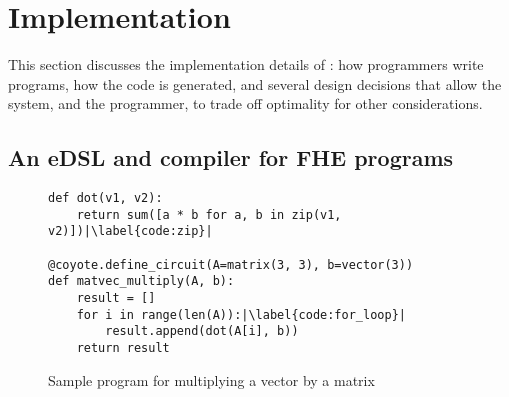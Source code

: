 \section{Implementation}\label{sec:implementation}

This section discusses the implementation details of \system: how programmers write \system programs, how the code is generated, and several design decisions that allow the system, and the programmer, to trade off optimality for other considerations.

  

\subsection{An eDSL and compiler for FHE programs}
\begin{figure}
    \begin{verbatim}
def dot(v1, v2):
    return sum([a * b for a, b in zip(v1, v2)])|\label{code:zip}|
  
@coyote.define_circuit(A=matrix(3, 3), b=vector(3))
def matvec_multiply(A, b):
    result = []
    for i in range(len(A)):|\label{code:for_loop}|
        result.append(dot(A[i], b))
    return result
    \end{verbatim}
    \caption{Sample \system program for multiplying a vector by a matrix}\label{fig:coyote-program}
\end{figure}

            
